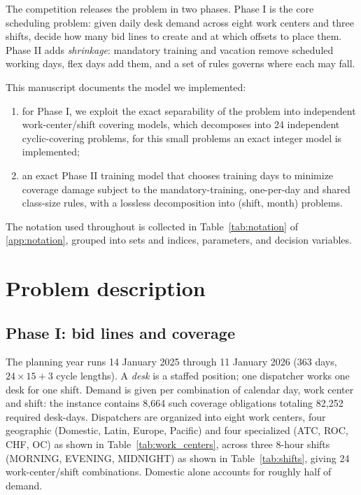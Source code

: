 \documentclass[preprint,12pt]{elsarticle}
\begin{document}
The competition releases the problem in two phases. Phase I is the core scheduling problem: given daily desk demand across eight work centers and three shifts, decide how many bid lines to create and at which offsets to place them. Phase II adds \emph{shrinkage}: mandatory training and vacation remove scheduled working days, flex days add them, and a set of rules governs where each may fall.

This manuscript documents the model we implemented:
\begin{enumerate}
   \item for Phase I, we exploit the exact separability of the problem into independent work-center/shift covering models, which decomposes into 24 independent cyclic-covering problems, for this small problems an exact integer model is implemented;
   \item an exact Phase II training model that chooses training days to minimize coverage damage subject to the mandatory-training, one-per-day and shared class-size rules, with a lossless decomposition into (shift, month) problems.
\end{enumerate}

The notation used throughout is collected in Table~\ref{tab:notation} of \ref{app:notation}, grouped into sets and indices, parameters, and decision variables.

\section{Problem description}
   \subsection{Phase I: bid lines and coverage}
      The planning year runs 14 January 2025 through 11 January 2026 (363 days, $24\times15+3$ cycle lengths). A \emph{desk} is a staffed position; one dispatcher works one desk for one shift. Demand is given per combination of calendar day, work center and shift: the instance contains 8,664 such coverage obligations totaling 82,252 required desk-days. Dispatchers are organized into eight work centers, four geographic (Domestic, Latin, Europe, Pacific) and four specialized (ATC, ROC, CHF, OC) as shown in Table~\ref{tab:work_centers}, across three 8-hour shifts (MORNING, EVENING, MIDNIGHT) as shown in Table~\ref{tab:shifts}, giving 24 work-center/shift combinations. Domestic alone accounts for roughly half of demand.
\end{document}

